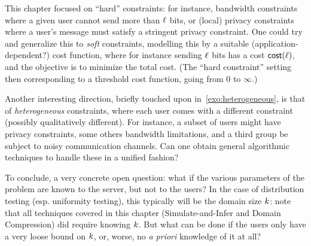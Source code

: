 \begin{openproblem}
	This chapter focused on ``hard'' constraints: for instance, bandwidth constraints where a given user cannot send more than $\ell$ bits, or (local) privacy constraints where a user's message must satisfy a stringent privacy constraint. One could try and generalize this to \emph{soft} constraints, modelling this by a suitable (application-dependent?) cost function, where for instance sending $\ell$ bits has a cost $\textsf{cost}(\ell)$, and the objective is to minimize the total cost. (The ``hard constraint'' setting then corresponding to a threshold cost function, going from $0$ to $\infty$.)
\end{openproblem}

\begin{openproblem}
Another interesting direction, briefly touched upon in~\cref{exo:heterogeneous}, is that of \emph{heterogeneous} constraints, where each user comes with a different constraint (possibly qualitatively different). For instance, a subset of users might have privacy constraints, some others bandwidth limitations, and a third group be subject to noisy communication channels. Can one obtain general algorithmic techniques to handle these in a unified fashion?
\end{openproblem}

\begin{openproblem}
To conclude, a very concrete open question: what if the various parameters of the problem are known to the server, but not to the users? In the case of distribution testing (esp. uniformity testing), this typically will be the domain size $k$: note that all techniques covered in this chapter (Simulate-and-Infer and Domain Compression) did require knowing $k$. But what can be done if the users only have a very loose bound on $k$, or, worse, no \emph{a priori} knowledge of it at all?
\end{openproblem}
